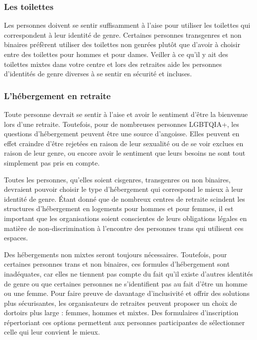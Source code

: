 \documentclass[12pt,openany]{book}
\begin{document}
\subsubsection*{Les toilettes}

\noindent Les personnes doivent se sentir suffisamment à l’aise pour utiliser les toilettes qui correspondent à leur identité de genre. Certaines personnes transgenres et non binaires préfèrent utiliser des toilettes non genrées plutôt que d’avoir à choisir entre des toilettes pour hommes et pour dames. Veiller à ce qu’il y ait des toilettes mixtes dans votre centre et lors des retraites aide les personnes d’identités de genre diverses à se sentir en sécurité et incluses.

\subsubsection*{L’hébergement en retraite}

\noindent Toute personne devrait se sentir à l’aise et avoir le sentiment d’être la bienvenue lors d’une retraite. Toutefois, pour de nombreuses personnes \mbox{LGBTQIA+}, les questions d’hébergement peuvent être une source d’angoisse. Elles peuvent en effet craindre d’être rejetées en raison de leur sexualité ou de se voir exclues en raison de leur genre, ou encore avoir le sentiment que leurs besoins ne sont tout simplement pas pris en compte.

Toutes les personnes, qu’elles soient cisgenres, transgenres ou non binaires, devraient pouvoir choisir le type d’hébergement qui correspond le mieux à leur identité de genre.
Étant donné que de nombreux centres de retraite scindent les structures d’hébergement en logements pour hommes et pour femmes, il est important que les organisations soient conscientes de leurs obligations légales en matière de non-discrimination à l’encontre des personnes trans qui utilisent ces espaces.

Des hébergements non mixtes seront toujours nécessaires. Toutefois, pour certaines personnes trans et non binaires, ces formules d’hébergement sont inadéquates, car elles ne tiennent pas compte du fait qu’il existe d’autres identités de genre ou que certaines personnes ne s’identifient pas au fait d’être un homme ou une femme. Pour faire preuve de davantage d’inclusivité et offrir des solutions plus sécurisantes, les organisateurs de retraites peuvent proposer un choix de dortoirs plus large : femmes, hommes et mixtes. Des formulaires d’inscription répertoriant ces options permettent aux personnes participantes de sélectionner celle qui leur convient le mieux.
\end{document}
